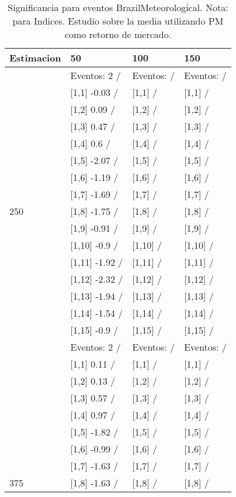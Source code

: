 \begin{table}

\caption{Significancia para eventos BrazilMeteorological. Nota: para Indices. Estudio sobre la media utilizando PM como retorno de mercado.}
\centering
\begin{tabular}[t]{llll}
\toprule
Estimacion & 50 & 100 & 150\\
\midrule
 & Eventos:  2 / & Eventos:   / & Eventos:   /\\
 & {}[1,1] -0.03  / & {}[1,1]  / & {}[1,1]  /\\
 & {}[1,2] 0.09  / & {}[1,2]  / & {}[1,2]  /\\
 & {}[1,3] 0.47  / & {}[1,3]  / & {}[1,3]  /\\
 & {}[1,4] 0.6  / & {}[1,4]  / & {}[1,4]  /\\
\addlinespace
 & {}[1,5] -2.07  / & {}[1,5]  / & {}[1,5]  /\\
 & {}[1,6] -1.19  / & {}[1,6]  / & {}[1,6]  /\\
 & {}[1,7] -1.69  / & {}[1,7]  / & {}[1,7]  /\\
250 & {}[1,8] -1.75  / & {}[1,8]  / & {}[1,8]  /\\
 & {}[1,9] -0.91  / & {}[1,9]  / & {}[1,9]  /\\
\addlinespace
 & {}[1,10] -0.9  / & {}[1,10]  / & {}[1,10]  /\\
 & {}[1,11] -1.92  / & {}[1,11]  / & {}[1,11]  /\\
 & {}[1,12] -2.32  / & {}[1,12]  / & {}[1,12]  /\\
 & {}[1,13] -1.94  / & {}[1,13]  / & {}[1,13]  /\\
 & {}[1,14] -1.54  / & {}[1,14]  / & {}[1,14]  /\\
\addlinespace
 & {}[1,15] -0.9  / & {}[1,15]  / & {}[1,15]  /\\
 & Eventos:  2 / & Eventos:   / & Eventos:   /\\
 & {}[1,1] 0.11  / & {}[1,1]  / & {}[1,1]  /\\
 & {}[1,2] 0.13  / & {}[1,2]  / & {}[1,2]  /\\
 & {}[1,3] 0.57  / & {}[1,3]  / & {}[1,3]  /\\
\addlinespace
 & {}[1,4] 0.97  / & {}[1,4]  / & {}[1,4]  /\\
 & {}[1,5] -1.82  / & {}[1,5]  / & {}[1,5]  /\\
 & {}[1,6] -0.99  / & {}[1,6]  / & {}[1,6]  /\\
 & {}[1,7] -1.63  / & {}[1,7]  / & {}[1,7]  /\\
375 & {}[1,8] -1.63  / & {}[1,8]  / & {}[1,8]  /\\

\end{tabular}
\end{table}
